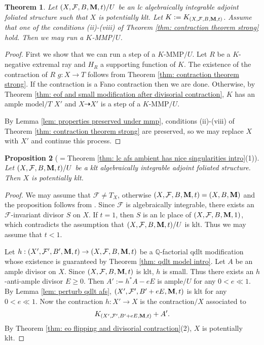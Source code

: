 \documentclass[12pt]{amsart}
\numberwithin{equation}{section}
\newcommand{\Mm}{{\bf{M}}}
\newcommand{\Qq}{\mathbb{Q}}
\newcommand{\Ff}{\mathcal{F}}
\newtheorem{thm}{Theorem}[section]
\newtheorem{prop}[thm]{Proposition}
\theoremstyle{definition}
\theoremstyle{definition}
\theoremstyle{definition}
\begin{document}
\begin{thm}\label{thm: run mmp strong} Let $(X,\Ff,B,\Mm,t)/U$ be an lc algebraically integrable adjoint foliated structure such that $X$ is potentially klt. Let $K:=K_{(X,\Ff,B,\Mm,t)}$. Assume that one of the conditions (ii)-(viii) of Theorem \ref{thm: contraction theorem strong} hold. Then we may run a $K$-MMP$/U$.
\end{thm}
\begin{proof}
First we show that we can run a step of a $K$-MMP$/U$. Let $R$ be a $K$-negative extremal ray and $H_R$ a supporting function of $K$. The existence of the contraction of $R$ $g: X\rightarrow T$ follows from Theorem \ref{thm: contraction theorem strong}. If the contraction is a Fano contraction then we are done. Otherwise, by Theorem \ref{thm: eof and small modification after divisorial contraction}, $K$ has an ample model$/T$ $X'$ and $X\dashrightarrow X'$ is a step of a $K$-MMP$/U$. 

By Lemma \ref{lem: properties preserved under mmp}, conditions (ii)-(viii) of Theorem \ref{thm: contraction theorem strong} are preserved, so we may replace $X$ with $X'$ and continue this process. 
\end{proof}

\begin{prop}[$=$Theorem \ref{thm: lc afs ambient has nice singularities intro}(1)]\label{prop: klt afs imply potentially klt}
Let $(X,\Ff,B,\Mm,t)/U$ be a klt algebraically integrable adjoint foliated structure. Then $X$ is potentially klt.
\end{prop}
\begin{proof}
We may assume that $\Ff\not=T_X$, otherwise $(X,\Ff,B,\Mm,t)=(X,B,\Mm)$ and the proposition follows from \cite[Lemma 3.4]{HL22}. Since $\Ff$ is algebraically integrable, there exists an $\Ff$-invariant divisor $S$ on $X$. If $t=1$, then $S$ is an lc place of $(X,\Ff,B,\Mm,1)$, which contradicts the assumption that $(X,\Ff,B,\Mm,t)/U$ is klt. Thus we may assume that $t<1$.

Let $h: (X',\Ff',B',\Mm,t)\rightarrow (X,\Ff,B,\Mm,t)$ be a $\Qq$-factorial qdlt modification whose existence is guaranteed by Theorem \ref{thm: qdlt model intro}. Let $A$ be an ample divisor on $X$.
    Since $(X,\Ff,B,\Mm,t)$ is klt, $h$ is small. Thus there exists an $h$-anti-ample divisor $E\geq 0$. Then $A':=h^\ast A-eE$ is ample$/U$ for any $0<e\ll 1$. By Lemma \ref{lem: perturb qdlt afs}, $(X',\Ff',B'+eE,\Mm,t)$ is klt for any $0<e\ll 1$. Now the contraction $h: X'\rightarrow X$ is the contraction$/X$ associated to
    $$K_{(X',\Ff',B'+eE,\Mm,t)}+A'.$$
    By Theorem \ref{thm: eo flipping and divisorial contraction}(2), $X$ is potentially klt.
\end{proof}
\end{document}
